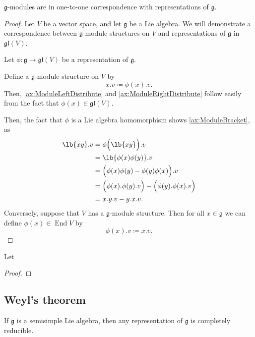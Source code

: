 \documentclass{article}
\DeclarePairedDelimiter\lb\lbrack\rbrack
\DeclareMathOperator{\End}{End}
\newcommand*\frkg{{\ensuremath{\mathfrak{g}}}}
\newcommand*\gl{\ensuremath{\mathfrak{gl}}}
\newcommand*\acts{.}
\begin{document}
\begin{proposition}
    $\frkg$-modules are in one-to-one correspondence with representations of $\frkg$.
\end{proposition}

\begin{proof}
    Let $V$ be a vector space, and let $\frkg$ be a Lie algebra.
    We will demonstrate a correspondence between $\frkg$-module structures on $V$ and representations of $\frkg$ in $\gl(V)$.

    Let $\phi: \frkg \to \gl(V)$ be a representation of $\frkg$.

    Define a $\frkg$-module structure on $V$ by
    \[
        x.v
        \coloneq
        \phi(x) \acts v.
    \]
    Then, \ref{ax:ModuleLeftDistribute} and \ref{ax:ModuleRightDistribute} follow easily from the fact that $\phi(x) \in \gl(V)$.

    Then, the fact that $\phi$ is a Lie algebra homomorphism shows \ref{ax:ModuleBracket}, as
    \begin{align*}
        \lb{xy}.v
        &=
        \phi\Big(\lb{xy}\Big) \acts v
        \\
        &=
        \lb{\phi(x)\phi(y)} \acts v
        \\
        &=
        \Big(
            \phi(x)\phi(y) - \phi(y)\phi(x)
        \Big)
        \acts v
        \\
        &=
        \Big(
            \phi(x) \acts \phi(y) \acts v
        \Big) 
        -
        \Big(
            \phi(y) \acts \phi(x) \acts v
        \Big) 
        \\
        &=
        x.y.v - y.x.v.
    \end{align*}
    Conversely, suppose that $V$ has a $\frkg$-module structure.
    Then for all $x \in \frkg$ we can define $\phi(x) \in \End V$ by
    \[
        \phi(x) \acts v
        \coloneq
        x.v.
    \]
\end{proof}

\begin{theorem}
    Let
\end{theorem}
\begin{proof}
\end{proof}

\subsection{Weyl's theorem}

\begin{theorem}
    If $\frkg$ is a semisimple Lie algebra, then any representation of $\frkg$ is completely reducible.
\end{theorem}
\end{document}
